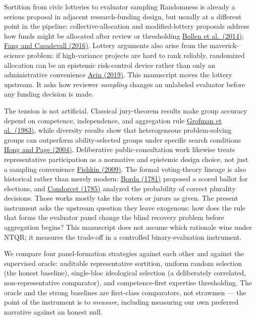 \documentclass[
  ignorenonframetext,
]{beamer}
\begin{document}
\begin{frame}[allowframebreaks]{Sortition from civic lotteries to
evaluator sampling}
Randomness is already a serious proposal in adjacent research-funding
design, but usually at a different point in the pipeline:
collective-allocation and modified-lottery proposals address how funds
might be allocated after review or thresholding
\href{https://doi.org/10.1002/embr.201338068}{Bollen et al.~(2014)};
\href{https://doi.org/10.1128/mBio.00422-16}{Fang and Casadevall
(2016)}. Lottery arguments also arise from the maverick-science problem:
if high-variance projects are hard to rank reliably, randomized
allocation can be an epistemic risk-control device rather than only an
administrative convenience
\href{https://doi.org/10.1016/j.shpsa.2018.11.006}{Avin (2019)}. This
manuscript moves the lottery upstream. It asks how reviewer
\emph{sampling} changes an unlabeled evaluator before any funding
decision is made.

The tension is not artificial. Classical jury-theorem results make group
accuracy depend on competence, independence, and aggregation rule
\href{https://doi.org/10.1007/BF00125672}{Grofman et al.~(1983)}, while
diversity results show that heterogeneous problem-solving groups can
outperform ability-selected groups under specific search conditions
\href{https://doi.org/10.1073/pnas.0403723101}{Hong and Page (2004)}.
Deliberative public-consultation work likewise treats representative
participation as a normative and epistemic design choice, not just a
sampling convenience
\href{https://global.oup.com/academic/product/when-the-people-speak-9780199604432}{Fishkin
(2009)}. The formal voting-theory lineage is also historical rather than
merely modern:
\href{https://bibbase.org/network/publication/denbspborda-mmoiresurleslectionsauscrutin-1781}{Borda
(1781)} proposed a scored ballot for elections, and
\href{https://archive.org/details/bub_gb_RzAVAAAAQAAJ}{Condorcet (1785)}
analyzed the probability of correct plurality decisions. Those works
mostly take the voters or jurors as given. The present instrument asks
the upstream question they leave exogenous: how does the rule that forms
the evaluator panel change the blind recovery problem before aggregation
begins? This manuscript does not assume which rationale wins under NTQR;
it measures the trade-off in a controlled binary-evaluation instrument.

We compare four panel-formation strategies against each other and
against the supervised oracle: auditable representative sortition,
uniform random selection (the honest baseline), single-bloc ideological
selection (a deliberately correlated, non-representative comparator),
and competence-first expertise thresholding. The oracle and the strong
baselines are first-class comparators, not strawmen --- the point of the
instrument is to \emph{measure}, including measuring our own preferred
narrative against an honest null.
\end{frame}
\end{document}
